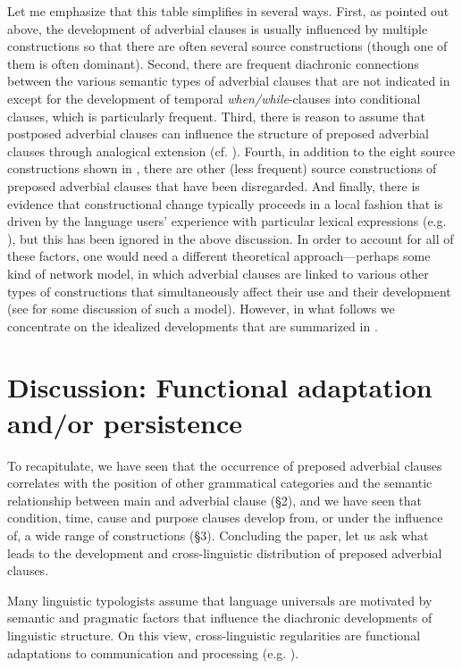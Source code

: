 \documentclass[output=paper]{langsci/langscibook}
\begin{document}
Let me emphasize that this table simplifies in several ways. First, as pointed out above, the development of adverbial clauses is usually influenced by multiple constructions so that there are often several source constructions (though one of them is often dominant). Second, there are frequent diachronic connections between the various semantic types of adverbial clauses that are not indicated in  except for the development of temporal \textit{when/while}-clauses into conditional clauses, which is particularly frequent. Third, there is reason to assume that postposed adverbial clauses can influence the structure of preposed adverbial clauses through analogical extension (cf. \citealt{Traugott1985}). Fourth, in addition to the eight source constructions shown in , there are other (less frequent) source constructions of preposed adverbial clauses that have been disregarded. And finally, there is evidence that constructional change typically proceeds in a local fashion that is driven by the language users’ experience with particular lexical expressions (e.g. \citealt{Givón1991}), but this has been ignored in the above discussion. In order to account for all of these factors, one would need a different theoretical approach—perhaps some kind of network model, in which adverbial clauses are linked to various other types of constructions that simultaneously affect their use and their development (see \citealt{Diessel2015} for some discussion of such a model). However, in what follows we concentrate on the idealized developments that are summarized in .

\section{Discussion: Functional adaptation and/or persistence}

To recapitulate, we have seen that the occurrence of preposed adverbial clauses correlates with the position of other grammatical categories and the semantic relationship between main and adverbial clause (§2), and we have seen that condition, time, cause and purpose clauses develop from, or under the influence of, a wide range of constructions (§3). Concluding the paper, let us ask what leads to the development and cross-linguistic distribution of preposed adverbial clauses.

Many linguistic typologists assume that language universals are motivated by semantic and pragmatic factors that influence the diachronic developments of linguistic structure. On this view, cross-linguistic regularities are functional adaptations to communication and processing (e.g. \citealt{FoleyVanValin1984,Dik1989,Hawkins2004}). 
\end{document}
